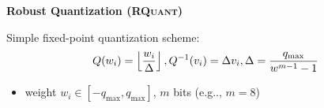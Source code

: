 \documentclass[64pt]{beamer}
\makeatletter
\DeclareRobustCommand\onedot{\futurelet\@let@token\@onedot}
\def\@onedot{\ifx\@let@token.\else.\null\fi\xspace}
\def\eg{e.g\onedot} \def\Eg{E.g\onedot}
\makeatother
\begin{document}
	\begin{frame}[t]{\bfseries Robust Quantization (\textsc{RQuant})}
		\Large
		
		Simple fixed-point quantization scheme:
		\begin{align*}
			Q(w_i) = \left\lfloor\frac{w_i}{\Delta}\right\rfloor, Q^{-1}(v_i) = \Delta v_i, \Delta = \frac{q_{\text{max}}}{w^{m - 1} - 1}\notag
		\end{align*}
		\vspace*{-0.5cm}
		\begin{itemize}
			\item weight $w_i \in [-q_{\text{max}}, q_{\text{max}}]$, $m$ bits (\eg, $m = 8$)
		\end{itemize}
		\vspace*{0.15cm}
	\end{frame}
	
\end{document}

